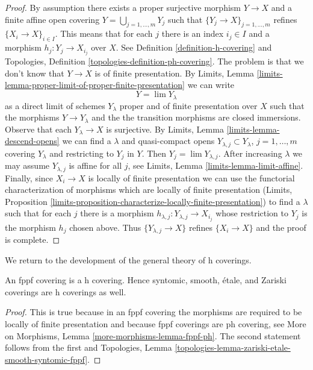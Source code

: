 \begin{proof}
By assumption there exists a proper surjective morphism
$Y \to X$ and a finite affine open covering
$Y = \bigcup_{j = 1, \ldots, m} Y_j$ such that
$\{Y_j \to X\}_{j = 1, \ldots, m}$ refines $\{X_i \to X\}_{i \in I}$.
This means that for each $j$ there is an index $i_j \in I$
and a morphism $h_j : Y_j \to X_{i_j}$ over $X$.
See Definition \ref{definition-h-covering} and
Topologies, Definition \ref{topologies-definition-ph-covering}.
The problem is that we don't know that $Y \to X$ is of finite
presentation.
By
Limits, Lemma \ref{limits-lemma-proper-limit-of-proper-finite-presentation}
we can write
$$
Y = \lim Y_\lambda
$$
as a direct limit of schemes $Y_\lambda$ proper and of finite presentation
over $X$ such that the morphisms $Y \to Y_\lambda$ and the
the transition morphisms are closed immersions. Observe that
each $Y_\lambda \to X$ is surjective.
By Limits, Lemma \ref{limits-lemma-descend-opens}
we can find a $\lambda$ and quasi-compact opens
$Y_{\lambda, j} \subset Y_\lambda$, $j = 1, \ldots, m$
covering $Y_\lambda$ and restricting to $Y_j$ in $Y$.
Then $Y_j = \lim Y_{\lambda, j}$.
After increasing $\lambda$ we may assume $Y_{\lambda, j}$
is affine for all $j$, see
Limits, Lemma \ref{limits-lemma-limit-affine}.
Finally, since $X_i \to X$ is locally of finite presentation
we can use the functorial characterization of morphisms
which are locally of finite presentation
(Limits, Proposition
\ref{limits-proposition-characterize-locally-finite-presentation})
to find a $\lambda$ such that for each $j$ there is
a morphism $h_{\lambda, j} : Y_{\lambda, j} \to X_{i_j}$
whose restriction to $Y_j$ is the morphism $h_j$ chosen above.
Thus $\{Y_{\lambda, j} \to X\}$ refines
$\{X_i \to X\}$ and the proof is complete.
\end{proof}

\noindent
We return to the development of the general theory of h coverings.

\begin{lemma}
\label{lemma-zariski-h}
An fppf covering is a h covering. Hence syntomic, smooth, \'etale,
and Zariski coverings are h coverings as well.
\end{lemma}

\begin{proof}
This is true because in an fppf covering the morphisms are
required to be locally of finite presentation and because
fppf coverings are ph covering, see More on Morphisms,
Lemma \ref{more-morphisms-lemma-fppf-ph}.
The second statement follows from the first and
Topologies, Lemma \ref{topologies-lemma-zariski-etale-smooth-syntomic-fppf}.
\end{proof}

